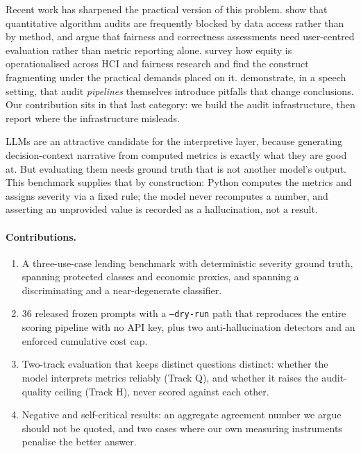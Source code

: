 \documentclass[10pt,letterpaper]{article}
\begin{document}
Recent work has sharpened the practical version of this problem.
\citet{zaccour2025} show that quantitative algorithm audits are frequently
blocked by data access rather than by method, and \citet{stumpf2024} argue that
fairness and correctness assessments need user-centred evaluation rather than
metric reporting alone. \citet{kim2025} survey how equity is operationalised
across HCI and fairness research and find the construct fragmenting under the
practical demands placed on it. \citet{mei2025} demonstrate, in a speech
setting, that audit \emph{pipelines} themselves introduce pitfalls that change
conclusions. Our contribution sits in that last category: we build the audit
infrastructure, then report where the infrastructure misleads.

LLMs are an attractive candidate for the interpretive layer, because generating
decision-context narrative from computed metrics is exactly what they are good
at. But evaluating them needs ground truth that is not another model's output.
This benchmark supplies that by construction: Python computes the metrics and
assigns severity via a fixed rule; the model never recomputes a number, and
asserting an unprovided value is recorded as a hallucination, not a result.

\paragraph{Contributions.}
\begin{enumerate}[leftmargin=1.4em]
  \item A three-use-case lending benchmark with deterministic severity ground
        truth, spanning protected classes and economic proxies, and spanning a
        discriminating and a near-degenerate classifier.
  \item 36 released frozen prompts with a \texttt{--dry-run} path that
        reproduces the entire scoring pipeline with no API key, plus two
        anti-hallucination detectors and an enforced cumulative cost cap.
  \item Two-track evaluation that keeps distinct questions distinct: whether the
        model interprets metrics reliably (Track Q), and whether it raises the
        audit-quality ceiling (Track H), never scored against each other.
  \item Negative and self-critical results: an aggregate agreement number we
        argue should not be quoted, and two cases where our own measuring
        instruments penalise the better answer.
\end{enumerate}
\end{document}
